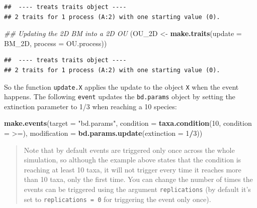 \documentclass[
]{book}
\newenvironment{Shaded}{\begin{snugshade}}{\end{snugshade}}
\newcommand{\CommentTok}[1]{\textcolor[rgb]{0.56,0.35,0.01}{\textit{#1}}}
\newcommand{\DataTypeTok}[1]{\textcolor[rgb]{0.13,0.29,0.53}{#1}}
\newcommand{\DecValTok}[1]{\textcolor[rgb]{0.00,0.00,0.81}{#1}}
\newcommand{\KeywordTok}[1]{\textcolor[rgb]{0.13,0.29,0.53}{\textbf{#1}}}
\newcommand{\NormalTok}[1]{#1}
\newcommand{\OperatorTok}[1]{\textcolor[rgb]{0.81,0.36,0.00}{\textbf{#1}}}
\newcommand{\StringTok}[1]{\textcolor[rgb]{0.31,0.60,0.02}{#1}}
\begin{document}
\begin{verbatim}
##  ---- treats traits object ---- 
## 2 traits for 1 process (A:2) with one starting value (0).
\end{verbatim}

\begin{Shaded}
\begin{Highlighting}[]
\CommentTok{\#\# Updating the 2D BM into a 2D OU}
\NormalTok{(OU\_2D \textless{}{-}}\StringTok{ }\KeywordTok{make.traits}\NormalTok{(}\DataTypeTok{update =}\NormalTok{ BM\_2D, }\DataTypeTok{process =}\NormalTok{ OU.process))}
\end{Highlighting}
\end{Shaded}

\begin{verbatim}
##  ---- treats traits object ---- 
## 2 traits for 1 process (A:2) with one starting value (0).
\end{verbatim}

So the function \texttt{update.X} applies the update to the object \texttt{X} when the event happens.
The following \texttt{event} updates the \texttt{bd.params} object by setting the extinction parameter to 1/3 when reaching a 10 species:

\begin{Shaded}
\begin{Highlighting}[]
\KeywordTok{make.events}\NormalTok{(}\DataTypeTok{target =} \StringTok{"bd.params"}\NormalTok{,}
            \DataTypeTok{condition =} \KeywordTok{taxa.condition}\NormalTok{(}\DecValTok{10}\NormalTok{, }\DataTypeTok{condition =} \StringTok{\textasciigrave{}}\DataTypeTok{\textgreater{}=}\StringTok{\textasciigrave{}}\NormalTok{),}
            \DataTypeTok{modification =} \KeywordTok{bd.params.update}\NormalTok{(}\DataTypeTok{extinction =} \DecValTok{1}\OperatorTok{/}\DecValTok{3}\NormalTok{))}
\end{Highlighting}
\end{Shaded}

\begin{quote}
Note that by default events are triggered only once across the whole simulation, so although the example above states that the condition is reaching at least 10 taxa, it will not trigger every time it reaches more than 10 taxa, only the first time. You can change the number of times the events can be triggered using the argument \texttt{replications} (by default it's set to \texttt{replications\ =\ 0} for triggering the event only once).
\end{quote}
\end{document}
